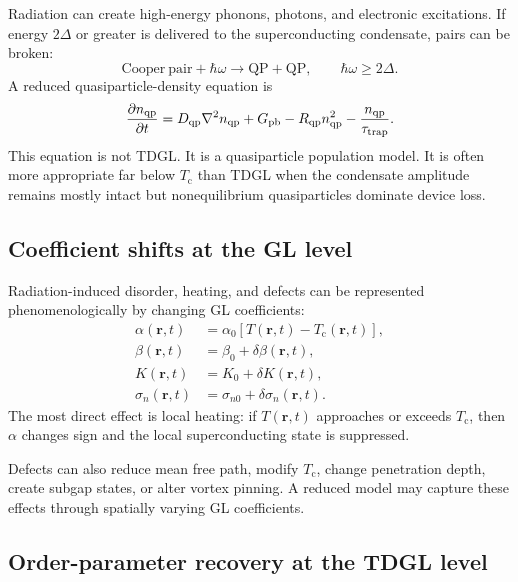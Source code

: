 \documentclass[11pt]{article}
\numberwithin{equation}{section}
\newcommand{\rvec}{\bm{r}}
\newcommand{\Tc}{T_{\mathrm{c}}}
\begin{document}
Radiation can create high-energy phonons, photons, and electronic excitations. If energy $2\Delta$ or greater is delivered to the superconducting condensate, pairs can be broken:
\begin{equation}
\mathrm{Cooper\ pair}+\hbar\omega\to \mathrm{QP}+\mathrm{QP},
\qquad \hbar\omega\ge 2\Delta.
\end{equation}
A reduced quasiparticle-density equation is
\begin{equation}
\pdv{n_{\mathrm{qp}}}{t}=D_{\mathrm{qp}}\nabla^2 n_{\mathrm{qp}}+G_{\mathrm{pb}}-R_{\mathrm{qp}}n_{\mathrm{qp}}^2-\frac{n_{\mathrm{qp}}}{\tau_{\mathrm{trap}}}.
\end{equation}
This equation is not TDGL. It is a quasiparticle population model. It is often more appropriate far below $\Tc$ than TDGL when the condensate amplitude remains mostly intact but nonequilibrium quasiparticles dominate device loss.

\subsection{Coefficient shifts at the GL level}

Radiation-induced disorder, heating, and defects can be represented phenomenologically by changing GL coefficients:
\begin{align}
\alpha(\rvec,t)&=\alpha_0[T(\rvec,t)-\Tc(\rvec,t)],\\
\beta(\rvec,t)&=\beta_0+\delta\beta(\rvec,t),\\
K(\rvec,t)&=K_0+\delta K(\rvec,t),\\
\sigma_n(\rvec,t)&=\sigma_{n0}+\delta\sigma_n(\rvec,t).
\end{align}
The most direct effect is local heating: if $T(\rvec,t)$ approaches or exceeds $\Tc$, then $\alpha$ changes sign and the local superconducting state is suppressed.

Defects can also reduce mean free path, modify $\Tc$, change penetration depth, create subgap states, or alter vortex pinning. A reduced model may capture these effects through spatially varying GL coefficients.

\subsection{Order-parameter recovery at the TDGL level}
\end{document}
